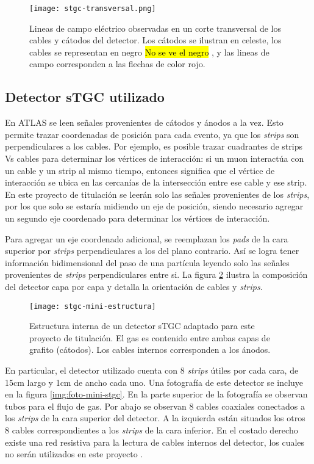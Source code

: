 	\begin{figure}[h]
		\centering
		\texttt{[image: stgc-transversal.png]}
		\caption{Lineas de campo eléctrico observadas en un corte transversal de los cables y cátodos del detector. Los cátodos se ilustran en celeste, los cables se representan en negro \hl{No se ve el negro} , y las lineas de campo corresponden a las flechas de color rojo\cite{DeSmet2011StudyLab}.}
		\label{img:stgc-field}
	\end{figure}

\subsection{Detector sTGC utilizado}
	En ATLAS se leen señales provenientes de cátodos y ánodos a la vez. Esto permite trazar coordenadas de posición para cada evento, ya que los \textit{strips} son perpendiculares a los cables. Por ejemplo, es posible trazar cuadrantes de strips Vs cables  para determinar los vértices de interacción: si un muon interactúa con un cable y un strip al mismo tiempo, entonces significa que el vértice de interacción se ubica en las cercanías de la intersección entre ese cable y ese strip. En este proyecto de titulación se leerán solo las señales provenientes de los \textit{strips}, por los que solo se estaría midiendo un eje de posición, siendo necesario agregar un segundo eje coordenado para determinar los vértices de interacción.
	
	Para agregar un eje coordenado adicional, se reemplazan los \textit{pads} de la cara superior por \textit{strips} perpendiculares a los del plano contrario. Así se logra tener información bidimensional del paso de una partícula leyendo solo las señales provenientes de \textit{strips} perpendiculares entre si. La figura \ref{img:stgc-mini-estructura} ilustra la composición del detector capa por capa y detalla la orientación de cables y \textit{strips}.
	
	\begin{figure}[h]
		\centering
		\texttt{[image: stgc-mini-estructura]}
		\caption{Estructura interna de un detector sTGC adaptado para este proyecto de titulación. El gas es contenido entre ambas capas de grafito (cátodos). Los cables internos corresponden a los ánodos.}
		\label{img:stgc-mini-estructura}
	\end{figure}

	En particular, el detector utilizado cuenta con 8 \textit{strips} útiles  por cada cara, de 15cm largo y 1cm de ancho cada uno. Una fotografía de este detector se incluye en la figura \ref{img:foto-mini-stgc}. En la parte superior de la fotografía se observan tubos para el flujo de gas. Por abajo se observan 8 cables coaxiales conectados a los \textit{strips} de la cara superior del detector. A la izquierda están situados los otros 8 cables correspondientes a los \textit{strips} de la cara inferior. En el costado derecho existe una red resistiva para la lectura de cables internos del detector, los cuales no serán utilizados en este proyecto .
	
